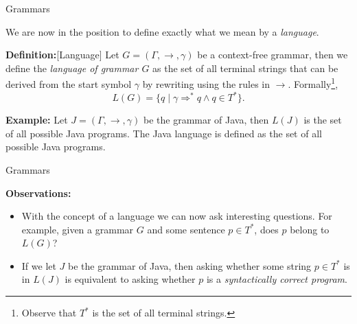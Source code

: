 \documentclass{beamer}
\begin{document}
\begin{frame}[fragile]{Grammars}

\small
We are now in the position to define exactly what we mean by a {\em language}.

\vspace{.2in}
{\bf Definition:}[Language] Let $G = (\Gamma,\rightarrow,\gamma)$ be a
context-free grammar, then we define the {\em language of
grammar $G$} as the set of all terminal strings that can be derived from the start symbol $\gamma$ by rewriting
using the rules in $\rightarrow$.  Formally\footnote{Observe that $T^*$ is the set of all terminal strings.},
\[
L(G) = \{ q \mid \gamma \Rightarrow^* q \wedge q\in T^*\}.
\]

\vspace{.3in}
{\bf Example:} Let $J = (\Gamma,\rightarrow,\gamma)$ be the grammar of Java, then $L(J)$ is the set of all possible Java
programs.  The Java language is defined as the set of all possible Java programs.
\end{frame}


\begin{frame}[fragile]{Grammars}

\small
{\bf Observations:}
\begin{itemize}
\item
With the concept of a language we can now ask interesting questions.  For example,
given a grammar $G$ and some sentence $p\in T^*$, does $p$ belong to $L(G)$?
\item
If we let $J$ be the grammar of Java, then asking whether some string $p\in T^*$ is in $L(J)$
is equivalent to asking whether $p$ is a {\em syntactically correct program}.
\end{itemize}

\end{frame}
\end{document}
